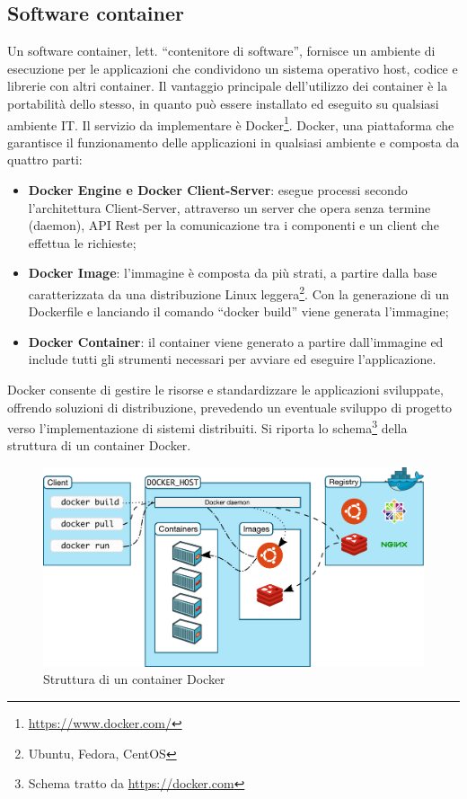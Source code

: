 \subsection{Software container} \label{software_container}
Un software container, lett. ``contenitore di software'', fornisce un ambiente di esecuzione per le applicazioni che condividono un sistema operativo host, codice e librerie con altri container. \cite{syed2015software}
Il vantaggio principale dell'utilizzo dei container \`e la portabilità dello stesso, in quanto pu\`o essere installato ed eseguito su qualsiasi ambiente IT.
Il servizio da implementare è Docker\footnote{\url{https://www.docker.com/}}.
Docker, una piattaforma che garantisce il funzionamento delle applicazioni in qualsiasi ambiente e composta da quattro parti:
\begin{itemize}
    \item \textbf{Docker Engine e Docker Client-Server}: esegue processi secondo l'architettura Client-Server, attraverso un server che opera senza termine (daemon), API Rest per la comunicazione tra i componenti e un client che effettua le richieste;
    \item \textbf{Docker Image}: l'immagine \`e composta da pi\`u strati, a partire dalla base caratterizzata da una distribuzione Linux leggera\footnote{Ubuntu, Fedora, CentOS}. Con la generazione di un Dockerfile e lanciando il comando ``docker build'' viene generata l'immagine;
    \item \textbf{Docker Container}: il container viene generato a partire dall'immagine ed include tutti gli strumenti necessari per avviare ed eseguire l'applicazione.
\end{itemize}
Docker consente di gestire le risorse e standardizzare le applicazioni sviluppate, offrendo soluzioni di distribuzione, prevedendo un eventuale sviluppo di progetto verso l'implementazione di sistemi
distribuiti.\cite{potdar2020performance}
Si riporta lo schema\footnote{Schema tratto da \url{https://docker.com}} della struttura di un container Docker.
\begin{figure}[!htb]
  \begin{center}
  \includegraphics[width=400pt]{immagini/architecture.pdf}
  \caption{Struttura di un container Docker}
\end{center}
\end{figure}
\newpage

